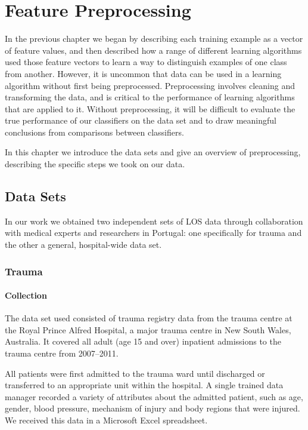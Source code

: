 \chapter{Feature Preprocessing} \label{chap:preprocess}

In the previous chapter we began by describing each training example as a
vector of feature values, and then described how a range of different
learning algorithms used those feature vectors to learn a way to
distinguish examples of one class from another. However, it is uncommon that
data can be used in a learning algorithm without first being preprocessed.
Preprocessing involves cleaning and transforming the data, and is critical
to the performance of learning algorithms that are applied to it. Without
preprocessing, it will be difficult to evaluate the true performance of
our classifiers on the data set and to draw meaningful conclusions from
comparisons between classifiers.

In this chapter we introduce the data sets and give an overview of
preprocessing, describing the specific steps we took on our data.

\section{Data Sets}
In our work we obtained two independent sets of LOS data through
collaboration with medical experts and researchers in Portugal: one
specifically for trauma and the other a general, hospital-wide data set.

\subsection{Trauma}
\subsubsection{Collection}
The data set used consisted of trauma registry data from the trauma centre
at the Royal Prince Alfred Hospital, a major trauma centre in New South Wales,
Australia. It covered all adult (age 15 and over) inpatient admissions to the
trauma centre from 2007--2011. 

All patients were first admitted to the trauma ward until discharged
or transferred to an appropriate unit within the hospital. A single trained
data manager recorded a variety of attributes about the admitted patient,
such as age, gender, blood pressure, mechanism of injury and body regions
that were injured. We received this data in a Microsoft Excel spreadsheet.

